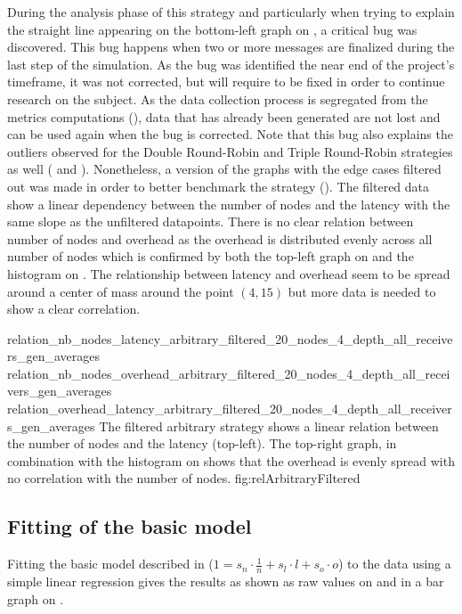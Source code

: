 During the analysis phase of this strategy and particularly when trying to
explain the straight line appearing on the bottom-left graph on
, a critical bug was discovered. This bug happens when two
or more messages are finalized during the last step of the simulation. As the
bug was identified the near end of the project's timeframe, it was not corrected,
but will require to be fixed in order to continue research on the subject. As
the data collection process is segregated from the metrics computations
(), data that has already been generated are not
lost and can be used again when the bug is corrected. Note that this bug also
explains the outliers observed for the Double Round-Robin and Triple Round-Robin
strategies as well ( and ).
Nonetheless, a version of the graphs with the edge cases filtered out was made
in order to better benchmark the strategy ().
The filtered data show a linear dependency between the number of nodes and
the latency with the same slope as the unfiltered datapoints. There is no clear
relation between number of nodes and overhead as the overhead is distributed
evenly across all number of nodes which is confirmed by both the top-left graph
on  and the histogram on .
The relationship between latency and overhead seem to be spread around a center
of mass around the point \((4, 15)\) but more data is needed to show a clear
correlation.


\triplefigure
    {relation_nb_nodes_latency_arbitrary_filtered_20_nodes_4_depth_all_receivers_gen_averages}
    {relation_nb_nodes_overhead_arbitrary_filtered_20_nodes_4_depth_all_receivers_gen_averages}
    {relation_overhead_latency_arbitrary_filtered_20_nodes_4_depth_all_receivers_gen_averages}
    {The filtered arbitrary strategy shows a linear relation between the number of
    nodes and the latency (top-left). The top-right graph, in combination with
    the histogram on  shows that the overhead is evenly
    spread with no correlation with the number of nodes.}
    {fig:relArbitraryFiltered}


\FloatBarrier
\subsection{Fitting of the basic model}
\label{ssec:fittingBase}
Fitting the basic model described in  (\(1 = s_n \cdot
\frac{1}{n} + s_l\cdot l + s_o\cdot o\)) to the data using a simple linear
regression gives the results as shown as raw values on  and
in a bar graph on .

